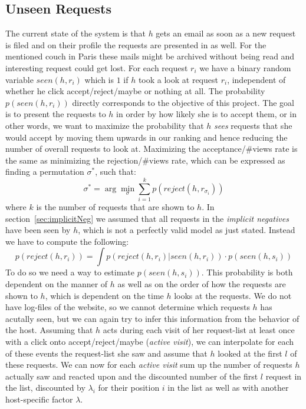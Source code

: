 \subsection{Unseen Requests}
\label{sec:unseen}
The current state of the system is that $h$ gets an email as soon as a new request is filed and on their profile the requests are presented in  as well. For the mentioned couch in Paris these mails might be archived without being read and interesting request could get lost. For each request $r_i$ we have a binary random variable $seen(h, r_i)$ which is $1$ if $h$ took a look at request $r_i$, independent of whether he click accept/reject/maybe or nothing at all. The probability $p(seen(h,r_i))$ directly corresponds to the objective of this project. The goal is to present the requests to $h$ in order by how likely she is to accept them, or in other words, we want to maximize the probability that $h$ \textit{sees} requests that she would accept by moving them upwards in our ranking and hence reducing the number of overall requests to look at. Maximizing the acceptance/\#views rate is the same as minimizing the rejection/\#views rate, which can be expressed as finding a permutation $\sigma^*$, such that:
$$\sigma^* = \arg\min_{\sigma}\sum_{i=1}^k p(reject(h, r_{\sigma_i}))$$
where $k$ is the number of requests that are shown to $h$. 
In section~\ref{sec:implicitNeg} we assumed that all requests in the \textit{implicit negatives} have been seen by $h$, which is not a perfectly valid model as just stated. Instead we have to compute the following:
$$p(reject(h, r_i)) = \int p(reject(h, r_i)|seen(h, r_i))\cdot p(seen(h, s_i))$$
To do so we need a way to estimate $p(seen(h,s_i))$. This probability is both dependent on the manner of $h$ as well as on the order of how the requests are shown to $h$, which is dependent on the time $h$ looks at the requests. We do not have log-files of the website, so we cannot determine which requests $h$ has acutally seen, but we can again try to infer this information from the behavior of the host. Assuming that $h$ acts during each visit of her request-list at least once with a click onto accept/reject/maybe (\textit{active visit}), we can interpolate for each of these events the request-list she saw and assume that $h$ looked at the first $l$ of these requests. We can now for each \textit{active visit} sum up the number of requests $h$ actually saw and reacted upon and the discounted number of the first $l$ request in the list, discounted by $\lambda_i$ for their position $i$ in the list as well as with another host-specific factor $\lambda$.


